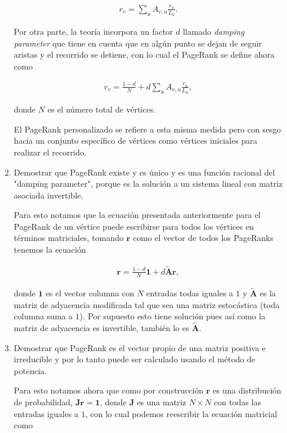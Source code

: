 \documentclass[answers]{exam}
\begin{document}
\begin{questions}
\begin{enumerate}
\begin{enumerate}
\begin{solution}
\begin{align*}
    r_v = \sum_uA_{v,u}\frac{r_u}{L_u}.
\end{align*}

Por otra parte, la teoría incorpora un factor $d$ llamado \emph{damping parameter} que tiene en cuenta que en algún punto se dejan de seguir aristas y el recorrido se detiene, con lo cual el PageRank se define ahora como

\begin{align*}
    r_v = \frac{1 - d}{N} + d\sum_uA_{v,u}\frac{r_u}{L_u},
\end{align*}

donde $N$ es el número total de vértices.

El PageRank personalizado se refiere a esta misma medida pero con sesgo hacia un conjunto específico de vértices como vértices iniciales para realizar el recorrido.
\end{solution}

\item Demostrar que PageRank existe y es único y es una función racional del "damping parameter",
porque es la solución a un sistema lineal con matriz asociada invertible.

\begin{solution}
Para esto notamos que la ecuación presentada anteriormente para el PageRank de un vértice puede escribirse para todos los vértices en términos matriciales, tomando $\mathbf{r}$ como el vector de todos los PageRanks tenemos la ecuación

\begin{align*}
    \mathbf{r} = \frac{1 - d}{N}\mathbf{1} + d\mathbf{\tilde{A}r},
\end{align*}

donde $\mathbf{1}$ es el vector columna con $N$ entradas todas iguales a $1$ y $\mathbf{\tilde{A}}$ es la matriz de adyacencia modificada tal que sea una matriz estocástica (toda columna suma a $1$). Por supuesto esto tiene solución pues así como la matriz de adyacencia es invertible, también lo es $\mathbf{\tilde{A}}$.
\end{solution}

\item Demostrar que PageRank es el vector propio de una matriz positiva e irreducible y por lo tanto puede ser calculado usando el método de potencia.

\begin{solution}
Para esto notamos ahora que como por construcción $\mathbf{r}$ es una distribución de probabilidad, $\mathbf{Jr} = \mathbf{1}$, donde $\mathbf{J}$ es una matriz $N \times N$ con todas las entradas iguales a $1$, con lo cual podemos reescribir la ecuación matricial como


\end{solution}
\end{enumerate}
\end{enumerate}
\end{questions}
\end{document}
